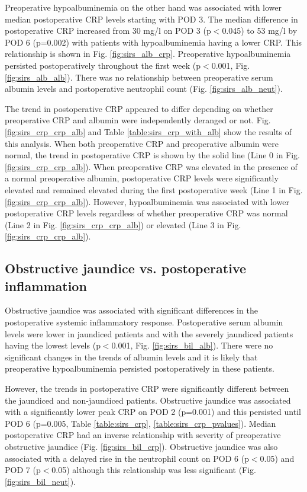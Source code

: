 Preoperative hypoalbuminemia on the other hand was associated with lower median postoperative CRP levels starting with POD 3. 
The median difference in postoperative CRP increased from 30 mg/l on POD 3 (p$<$0.045) to 53 mg/l by POD 6 (p=0.002) with patients with hypoalbuminemia having a lower CRP. 
This relationship is shown in Fig. \ref{fig:sirs_alb_crp}.
Preoperative hypoalbuminemia persisted postoperatively throughout the first week (p$<$0.001, Fig. \ref{fig:sirs_alb_alb}).
There was no relationship between preoperative serum albumin levels and postoperative neutrophil count (Fig. \ref{fig:sirs_alb_neut}).

The trend in postoperative CRP appeared to differ depending on whether preoperative CRP and albumin were independently deranged or not.
Fig. \ref{fig:sirs_crp_crp_alb} and Table \ref{table:sirs_crp_with_alb} show the results of this analysis.
When both preoperative CRP and preoperative albumin were normal, the trend in postoperative CRP is shown by the solid line (Line 0 in Fig. \ref{fig:sirs_crp_crp_alb}). 
When preoperative CRP was elevated in the presence of a normal preoperative albumin, postoperative CRP levels were significantly elevated and remained elevated during the first postoperative week (Line 1 in Fig. \ref{fig:sirs_crp_crp_alb}). 
However, hypoalbuminemia was associated with lower postoperative CRP levels regardless of whether preoperative CRP was normal (Line 2 in Fig. \ref{fig:sirs_crp_crp_alb}) or elevated (Line 3 in Fig. \ref{fig:sirs_crp_crp_alb}). 

\subsection{Obstructive jaundice vs. postoperative inflammation}
Obstructive jaundice was associated with significant differences in the postoperative systemic inflammatory response. 
Postoperative serum albumin levels were lower in jaundiced patients and with the severely jaundiced patients having the lowest levels (p$<$0.001, Fig. \ref{fig:sirs_bil_alb}). 
There were no significant changes in the trends of albumin levels and it is likely that preoperative hypoalbuminemia persisted postoperatively in these patients. 

However, the trends in postoperative CRP were significantly different between the jaundiced and non-jaundiced patients. 
Obstructive jaundice was associated with a significantly lower peak CRP on POD 2 (p=0.001) and this persisted until POD 6 (p=0.005, Table \ref{table:sirs_crp}, \ref{table:sirs_crp_pvalues}).
Median postoperative CRP had an inverse relationship with severity of preoperative obstructive jaundice (Fig. \ref{fig:sirs_bil_crp}).
Obstructive jaundice was also associated with a delayed rise in the neutrophil count on POD 6 (p$<$0.05) and POD 7 (p$<$0.05) although this relationship was less significant (Fig. \ref{fig:sirs_bil_neut}). 

